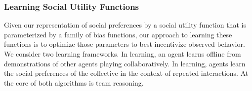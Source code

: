 
\subsubsection*{\large Learning Social Utility Functions}
\label{sec:learning}


Given our representation of social preferences by a social utility
function that is parameterized by a family of bias functions, our
approach to learning these functions is to optimize those parameters
to best incentivize observed behavior.  We consider two learning
frameworks.  In  learning, an agent learns offline from
demonstrations of other agents playing collaboratively.
In  learning, agents learn the social preferences
of the collective in the context of repeated interactions.
%
At the core of both algorithms is team reasoning.



